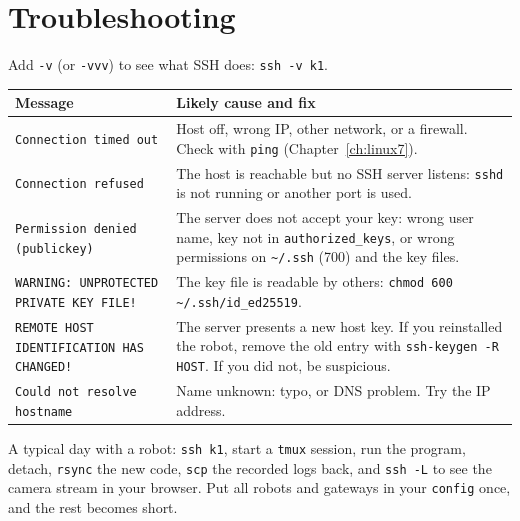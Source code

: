 \section*{Troubleshooting}
Add \texttt{-v} (or \texttt{-vvv}) to see what SSH does: \verb|ssh -v k1|.
\begin{center}
\renewcommand{\arraystretch}{1.25}
\begin{tabular}{p{5.2cm}p{8.4cm}}
\textbf{Message} & \textbf{Likely cause and fix}\\ \hline
\texttt{Connection timed out} & Host off, wrong IP, other network, or a firewall. Check with \texttt{ping} (Chapter~\ref{ch:linux7}).\\
\texttt{Connection refused} & The host is reachable but no SSH server listens: \texttt{sshd} is not running or another port is used.\\
\texttt{Permission denied (publickey)} & The server does not accept your key: wrong user name, key not in \texttt{authorized\_keys}, or wrong permissions on \texttt{\textasciitilde/.ssh} (700) and the key files.\\
\texttt{WARNING: UNPROTECTED PRIVATE KEY FILE!} & The key file is readable by others: \verb|chmod 600 ~/.ssh/id_ed25519|.\\
\texttt{REMOTE HOST IDENTIFICATION HAS CHANGED!} & The server presents a new host key. If you reinstalled the robot, remove the old entry with \verb|ssh-keygen -R HOST|. If you did not, be suspicious.\\
\texttt{Could not resolve hostname} & Name unknown: typo, or DNS problem. Try the IP address.\\
\end{tabular}
\end{center}

\begin{aibox}
A typical day with a robot: \texttt{ssh k1}, start a \texttt{tmux} session, run the program, detach, \texttt{rsync} the new code, \texttt{scp} the recorded logs back, and \texttt{ssh -L} to see the camera stream in your browser. Put all robots and gateways in your \texttt{config} once, and the rest becomes short.
\end{aibox}


